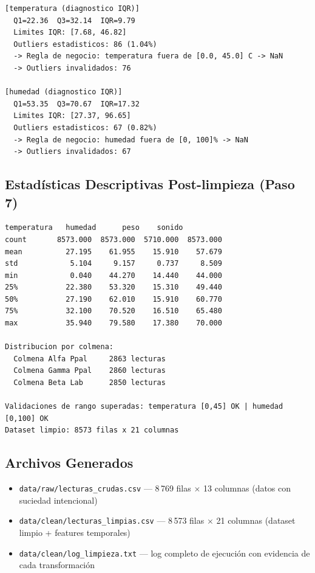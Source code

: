 \begin{lstlisting}[caption=Salida real del PASO 4 -- deteccion y tratamiento de outliers]
[temperatura (diagnostico IQR)]
  Q1=22.36  Q3=32.14  IQR=9.79
  Limites IQR: [7.68, 46.82]
  Outliers estadisticos: 86 (1.04%)
  -> Regla de negocio: temperatura fuera de [0.0, 45.0] C -> NaN
  -> Outliers invalidados: 76

[humedad (diagnostico IQR)]
  Q1=53.35  Q3=70.67  IQR=17.32
  Limites IQR: [27.37, 96.65]
  Outliers estadisticos: 67 (0.82%)
  -> Regla de negocio: humedad fuera de [0, 100]% -> NaN
  -> Outliers invalidados: 67
\end{lstlisting}

\subsection{Estadísticas Descriptivas Post-limpieza (Paso 7)}

\begin{lstlisting}[caption=Salida real del PASO 7 -- estadisticas descriptivas finales]
         temperatura   humedad      peso    sonido
count       8573.000  8573.000  5710.000  8573.000
mean          27.195    61.955    15.910    57.679
std            5.104     9.157     0.737     8.509
min            0.040    44.270    14.440    44.000
25%           22.380    53.320    15.310    49.440
50%           27.190    62.010    15.910    60.770
75%           32.100    70.520    16.510    65.480
max           35.940    79.580    17.380    70.000

Distribucion por colmena:
  Colmena Alfa Ppal     2863 lecturas
  Colmena Gamma Ppal    2860 lecturas
  Colmena Beta Lab      2850 lecturas

Validaciones de rango superadas: temperatura [0,45] OK | humedad [0,100] OK
Dataset limpio: 8573 filas x 21 columnas
\end{lstlisting}

\subsection{Archivos Generados}

\begin{itemize}\setlength{\itemsep}{2pt}
  \item \texttt{data/raw/lecturas\_crudas.csv} --- 8\,769 filas $\times$ 13 columnas (datos con suciedad intencional)
  \item \texttt{data/clean/lecturas\_limpias.csv} --- 8\,573 filas $\times$ 21 columnas (dataset limpio + features temporales)
  \item \texttt{data/clean/log\_limpieza.txt} --- log completo de ejecuci\'on con evidencia de cada transformaci\'on
\end{itemize}
